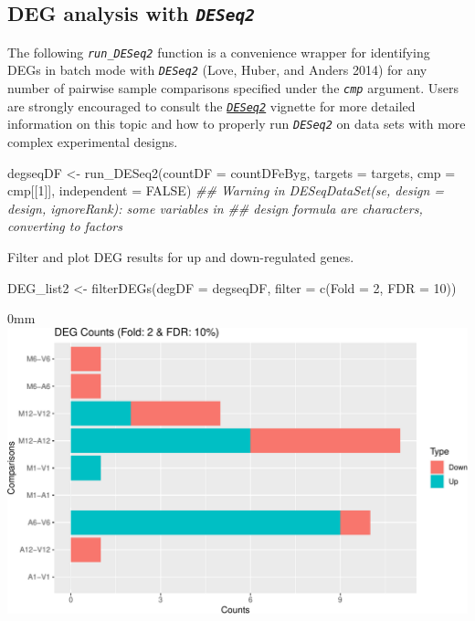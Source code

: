 \documentclass[14pt,]{article}
\newcommand{\hlnum}[1]{\textcolor[rgb]{0.816,0.125,0.439}{#1}}%
\newcommand{\hlstr}[1]{\textcolor[rgb]{0.251,0.627,0.251}{#1}}%
\newcommand{\hlcom}[1]{\textcolor[rgb]{0.502,0.502,0.502}{\textit{#1}}}%
\newcommand{\hlstd}[1]{\textcolor[rgb]{0.251,0.251,0.251}{#1}}%
\newcommand{\hlkwc}[1]{\textcolor[rgb]{0.251,0.251,0.251}{#1}}%
\newcommand{\hlkwd}[1]{\textcolor[rgb]{0.878,0.439,0.125}{#1}}%
\newenvironment{Shaded}{\begin{myshaded}}{\end{myshaded}}
\newcommand{\KeywordTok}[1]{\hlkwd{#1}}
\newcommand{\DataTypeTok}[1]{\hlkwc{#1}}
\newcommand{\DecValTok}[1]{\hlnum{#1}}
\newcommand{\StringTok}[1]{\hlstr{#1}}
\newcommand{\CommentTok}[1]{\hlcom{#1}}
\newcommand{\OtherTok}[1]{{#1}}
\newcommand{\NormalTok}[1]{\hlstd{#1}}
\begin{document}
\hypertarget{deg-analysis-with-deseq2}{%
\subsection{\texorpdfstring{DEG analysis with \emph{\texttt{DESeq2}}}{DEG analysis with DESeq2}}\label{deg-analysis-with-deseq2}}

The following \emph{\texttt{run\_DESeq2}} function is a convenience wrapper for
identifying DEGs in batch mode with \emph{\texttt{DESeq2}} (Love, Huber, and Anders 2014) for any number of
pairwise sample comparisons specified under the \emph{\texttt{cmp}} argument. Users
are strongly encouraged to consult the
\href{http://www.bioconductor.org/packages/devel/bioc/vignettes/DESeq2/inst/doc/DESeq2.pdf}{\emph{\texttt{DESeq2}}} vignette
for more detailed information on this topic and how to properly run \emph{\texttt{DESeq2}}
on data sets with more complex experimental designs.

\begin{Shaded}
\begin{Highlighting}[]
\NormalTok{degseqDF <-}\StringTok{ }\KeywordTok{run_DESeq2}\NormalTok{(}\DataTypeTok{countDF =}\NormalTok{ countDFeByg, }\DataTypeTok{targets =}\NormalTok{ targets, }\DataTypeTok{cmp =}\NormalTok{ cmp[[}\DecValTok{1}\NormalTok{]], }
    \DataTypeTok{independent =} \OtherTok{FALSE}\NormalTok{)}
\CommentTok{## Warning in DESeqDataSet(se, design = design, ignoreRank): some variables in}
\CommentTok{## design formula are characters, converting to factors}
\end{Highlighting}
\end{Shaded}

Filter and plot DEG results for up and down-regulated genes.

\begin{Shaded}
\begin{Highlighting}[]
\NormalTok{DEG_list2 <-}\StringTok{ }\KeywordTok{filterDEGs}\NormalTok{(}\DataTypeTok{degDF =}\NormalTok{ degseqDF, }\DataTypeTok{filter =} \KeywordTok{c}\NormalTok{(}\DataTypeTok{Fold =} \DecValTok{2}\NormalTok{, }\DataTypeTok{FDR =} \DecValTok{10}\NormalTok{))}
\end{Highlighting}
\end{Shaded}

\begin{adjustwidth}{\fltoffset}{0mm}
\includegraphics{systemPipeR_files/figure-latex/deseq2_deg_counts-1} \end{adjustwidth}
\end{document}
